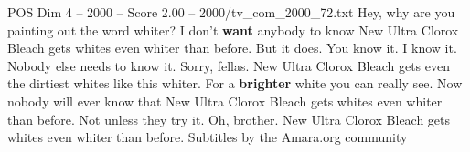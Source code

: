 \begin{textsample}{POS Dim 4 – 2000 – Score 2.00 – 2000/tv\_com\_2000\_72.txt}  \label{ex:f4_pos_072}
Hey, why are you painting out the word whiter?
I don't \textbf{want} anybody to know New Ultra Clorox Bleach gets whites even whiter than before.
But it does.
You know it.
I know it.
Nobody else needs to know it.
Sorry, fellas.
New Ultra Clorox Bleach gets even the dirtiest whites like this whiter.
For a \textbf{brighter} white you can really see.
Now nobody will ever know that New Ultra Clorox Bleach gets whites even whiter than before.
Not unless they try it.
Oh, brother.
New Ultra Clorox Bleach gets whites even whiter than before.
Subtitles by the Amara.org community

\end{textsample}
